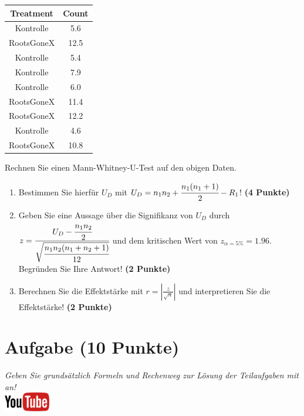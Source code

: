 \documentclass[a4paper, 9pt]{scrartcl}\usepackage[]{graphicx}\usepackage[]{xcolor}
\newenvironment{knitrout}{}{} %
\begin{document}
\begin{knitrout}
\color{fgcolor}\begin{table}[!h]
\centering
\begin{tabular}{cc}
\toprule
Treatment & Count\\
\midrule
Kontrolle & 5.6\\
RootsGoneX & 12.5\\
Kontrolle & 5.4\\
Kontrolle & 7.9\\
Kontrolle & 6.0\\
\addlinespace
RootsGoneX & 11.4\\
RootsGoneX & 12.2\\
Kontrolle & 4.6\\
RootsGoneX & 10.8\\
\bottomrule
\end{tabular}
\end{table}

\end{knitrout}

Rechnen Sie einen Mann-Whitney-U-Test auf den obigen Daten.

\begin{enumerate}
\item Bestimmen Sie hierf{\"u}r $U_D$ mit $U_D = n_1n_2 +
  \cfrac{n_1(n_1+1)}{2}-R_1$! \textbf{(4 Punkte)} 
\item Geben Sie eine Aussage {\"u}ber die Signifikanz von $U_D$ durch
  $z = \cfrac{U_D -
    \cfrac{n_1n_2}{2}}{\sqrt{\cfrac{n_1n_2(n_1+n_2+1)}{12}}}$ und dem
  kritischen Wert von $z_{\alpha = 5\%} = 1.96$. Begr{\"u}nden Sie Ihre
  Antwort! \textbf{(2 Punkte)}
\item Berechnen Sie die Effektst{\"a}rke mit $r = |\frac{z}{\sqrt{n}}| $ und
  interpretieren Sie die Effektst{\"a}rke! \textbf{(2 Punkte)} 
\end{enumerate} 
\clearpage

\section{Aufgabe \hfill (10 Punkte)}

\textit{Geben Sie grunds{\"a}tzlich Formeln und Rechenweg zur L{\"o}sung der
  Teilaufgaben mit an!} \\[1Ex]

\hfill\href{https://youtu.be/gC0SXiIG2wQ}{\includegraphics[width =
  2cm]{img/youtube}} %
\hspace{2Ex}
\end{document}
